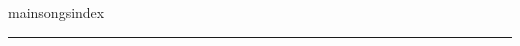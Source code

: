 ﻿%


\begin{songs}{mainsongsindex}















\end{songs}


% 

% 




\vfill
\begingroup
{}
\hfill
\hrule
\hfill
\newline
\newline
\par
\endgroup




